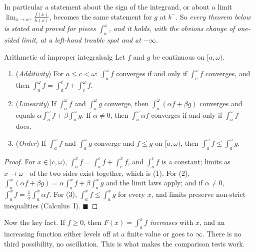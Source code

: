 \documentclass[11pt]{article}
\begin{document}
In particular a statement about the sign of the integrand, or about a limit $\lim_{x\to a^+}\frac{f(x)}{h(x)}$, becomes the same statement for $g$ at $b^-$. So \emph{every theorem below is stated and proved for pieces $\int_a^\omega$, and it holds, with the obvious change of one-sided limit, at a left-hand trouble spot and at $-\infty$.}

\begin{thm}{Arithmetic of improper integrals}{alg}
Let $f$ and $g$ be continuous on $[a,\omega)$.
\begin{enumerate}[label=(\arabic*),leftmargin=*]
  \item (\emph{Additivity}) For $a\le c<\omega$: $\int_a^\omega f$ converges if and only if $\int_c^\omega f$ converges, and then $\int_a^\omega f=\int_a^cf+\int_c^\omega f$.
  \item (\emph{Linearity}) If $\int_a^\omega f$ and $\int_a^\omega g$ converge, then $\int_a^\omega(\alpha f+\beta g)$ converges and equals $\alpha\int_a^\omega f+\beta\int_a^\omega g$. If $\alpha\ne0$, then $\int_a^\omega\alpha f$ converges if and only if $\int_a^\omega f$ does.
  \item (\emph{Order}) If $\int_a^\omega f$ and $\int_a^\omega g$ converge and $f\le g$ on $[a,\omega)$, then $\int_a^\omega f\le\int_a^\omega g$.
\end{enumerate}
\end{thm}
\begin{proof}
For $x\in[c,\omega)$, $\int_a^xf=\int_a^cf+\int_c^xf$, and $\int_a^cf$ is a constant; limits as $x\to\omega^-$ of the two sides exist together, which is (1). For (2), $\int_a^x(\alpha f+\beta g)=\alpha\int_a^xf+\beta\int_a^xg$ and the limit laws apply; and if $\alpha\ne0$, $\int_a^xf=\frac1\alpha\int_a^x\alpha f$. For (3), $\int_a^xf\le\int_a^xg$ for every $x$, and limits preserve non-strict inequalities (Calculus~I). $\blacksquare$
\end{proof}

Now the key fact. If $f\ge0$, then $F(x)=\int_a^xf$ \emph{increases} with $x$, and an increasing function either levels off at a finite value or goes to $\infty$. There is no third possibility, no oscillation. This is what makes the comparison tests work.
\end{document}
